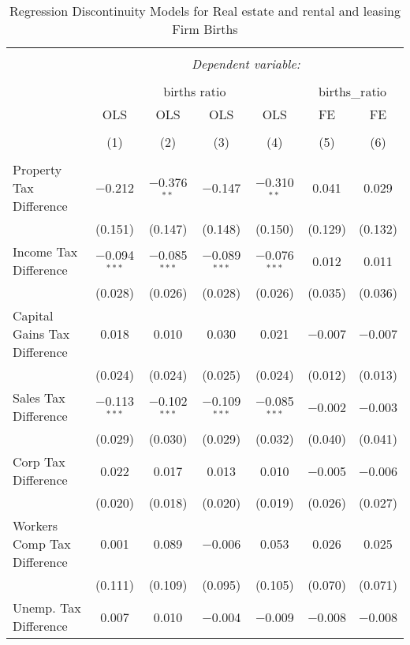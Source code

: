 
\begin{table}[!htbp] \centering 
  \caption{Regression Discontinuity Models for  Real estate and rental and leasing Firm Births} 
  \label{53rd} 
\begin{tabular}{@{\extracolsep{5pt}}lcccccc} 
\\[-1.8ex]\hline 
\hline \\[-1.8ex] 
 & \multicolumn{6}{c}{\textit{Dependent variable:}} \\ 
\cline{2-7} 
\\[-1.8ex] & \multicolumn{4}{c}{births ratio} & \multicolumn{2}{c}{births\_ratio} \\ 
 & OLS & OLS & OLS & OLS & FE & FE \\ 
\\[-1.8ex] & (1) & (2) & (3) & (4) & (5) & (6)\\ 
\hline \\[-1.8ex] 
 Property Tax Difference & $-$0.212 & $-$0.376$^{**}$ & $-$0.147 & $-$0.310$^{**}$ & 0.041 & 0.029 \\ 
  & (0.151) & (0.147) & (0.148) & (0.150) & (0.129) & (0.132) \\ 
  Income Tax Difference & $-$0.094$^{***}$ & $-$0.085$^{***}$ & $-$0.089$^{***}$ & $-$0.076$^{***}$ & 0.012 & 0.011 \\ 
  & (0.028) & (0.026) & (0.028) & (0.026) & (0.035) & (0.036) \\ 
  Capital Gains Tax Difference & 0.018 & 0.010 & 0.030 & 0.021 & $-$0.007 & $-$0.007 \\ 
  & (0.024) & (0.024) & (0.025) & (0.024) & (0.012) & (0.013) \\ 
  Sales Tax Difference & $-$0.113$^{***}$ & $-$0.102$^{***}$ & $-$0.109$^{***}$ & $-$0.085$^{***}$ & $-$0.002 & $-$0.003 \\ 
  & (0.029) & (0.030) & (0.029) & (0.032) & (0.040) & (0.041) \\ 
  Corp Tax Difference & 0.022 & 0.017 & 0.013 & 0.010 & $-$0.005 & $-$0.006 \\ 
  & (0.020) & (0.018) & (0.020) & (0.019) & (0.026) & (0.027) \\ 
  Workers Comp Tax Difference & 0.001 & 0.089 & $-$0.006 & 0.053 & 0.026 & 0.025 \\ 
  & (0.111) & (0.109) & (0.095) & (0.105) & (0.070) & (0.071) \\ 
  Unemp. Tax Difference & 0.007 & 0.010 & $-$0.004 & $-$0.009 & $-$0.008 & $-$0.008 \\ 

\end{tabular}
\end{table}
